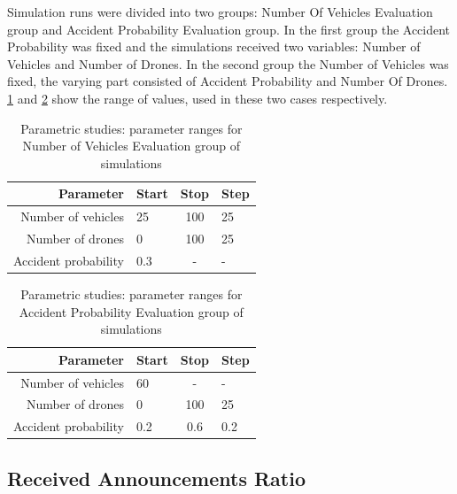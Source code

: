 \documentclass[]{nsm-thesis}
\begin{document}
Simulation runs were divided into two groups: Number Of Vehicles Evaluation group and Accident Probability Evaluation group. In the first group the Accident Probability was fixed and the simulations received two variables: Number of Vehicles and Number of Drones. In the second group the Number of Vehicles was fixed, the varying part consisted of Accident Probability and Number Of Drones. \cref{tab:inputrange1} and \cref{tab:inputrange2} show the range of values, used in these two cases respectively.

\begin{table}
    \centering
    \begin{tabular}{rlcl}
        \toprule
        Parameter & Start & Stop & Step \\
        \midrule
		Number of vehicles & 25 & 100 & 25 \\
		Number of drones & 0 & 100 & 25 \\
		Accident probability & 0.3 & - & - \\
        \bottomrule
    \end{tabular}
    \caption{Parametric studies: parameter ranges for Number of Vehicles Evaluation group of simulations}
    \label{tab:inputrange1}
\end{table}


\begin{table}
    \centering
    \begin{tabular}{rlcl}
        \toprule
        Parameter & Start & Stop & Step \\
        \midrule
		Number of vehicles & 60 & - & - \\
		Number of drones & 0 & 100 & 25 \\
		Accident probability & 0.2 & 0.6 & 0.2 \\
        \bottomrule
    \end{tabular}
    \caption{Parametric studies: parameter ranges for Accident Probability Evaluation group of simulations}
    \label{tab:inputrange2}
\end{table}



\subsection{Received Announcements Ratio}
\label{sec:ReceivedAnnouncementsRatio}
\end{document}
